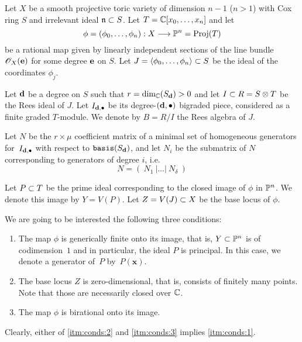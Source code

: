 \documentclass[fleqn,reqno]{amsart}
\begin{document}
\begin{paragraf}
\label{par:again}
\label{par:setup}
Let $X$ be a smooth projective toric variety of dimension $n-1$ ($n>1$)
with Cox ring $S$ and irrelevant ideal $\mathfrak{n}\subset S$.
Let $T=\mathbb{C}[x_0,\ldots,x_n]$ and let
\[
\phi=(\phi_0,\ldots,\phi_n):X\longrightarrow\mathbb{P}^n=\operatorname{Proj}(T)
\]
be a rational map given by linearly independent sections of the line bundle $\mathscr{O}_X(\mathbf e)$
for some degree $\mathbf e$ on $S$.
Let $J=\langle \phi_0,\ldots,\phi_n\rangle\subset S$ be the ideal of the coordinates $\phi_j$.

Let $\mathbf d$ be a degree on $S$ such that $r=\dim_{\mathbb{C}}(S_\mathbf d)>0$ and
let $I\subset R=S\otimes T$ be the Rees ideal of $J$.
Let $I_{\mathbf d,\bullet}$ be its degree-$(\mathbf d,\bullet)$ bigraded piece,
considered as a finite graded $T$-module.
We denote by $B=R/I$ the Rees algebra of $J$.

Let $N$ be the $r\times\mu$ coefficient matrix of
a minimal set of homogeneous generators for~$I_{\mathbf d,\bullet}$ with respect to $\mathop{\tt basis}(S_\mathbf d)$,
and let $N_i$ be the submatrix of $N$ corresponding to generators of degree $i$, i.e.
\[
N=(~N_1~|\ldots|~N_\delta~)
\]
\end{paragraf}

\begin{paragraf}
\label{par:conds}
Let $P\subset T$ be the prime ideal corresponding to the closed image of $\phi$ in $\mathbb{P}^n$.
We denote this image by $Y=V(P)$.
Let $Z=V(J)\subset X$ be the base locus of $\phi$.

We are going to be interested the following three conditions:
\begin{enumerate}
\item
\label{itm:conds:1}
The map $\phi$ is generically finite onto its image, that is,
$Y\subset\mathbb{P}^n$ is of codimension~$1$ and in particular, the ideal $P$ is principal.
In this case, we denote a generator of~$P$ by~$P(\mathbf x)$.

\item
\label{itm:conds:2} The base locus $Z$ is zero-dimensional, that is,
consists of finitely many points.
Note that those are necessarily closed over $\mathbb{C}$.

\item
\label{itm:conds:3} The map $\phi$ is birational onto its image.
\end{enumerate}

Clearly, either of \eqref{itm:conds:2} and \eqref{itm:conds:3} implies \eqref{itm:conds:1}.
\end{paragraf}
\end{document}

